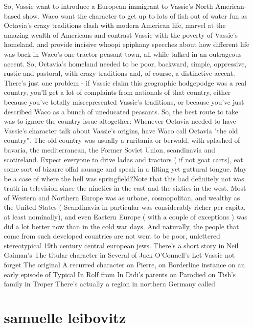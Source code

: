 \documentclass[12pt]{book}
\begin{document}
So, Vassie want to introduce a European immigrant to Vassie's North American-based show. Waco want the character to get up to lots of fish out of water fun as Octavia's crazy traditions clash with modern American life, marvel at the amazing wealth of Americans and contrast Vassie with the poverty of Vassie's homeland, and provide incisive whoopi epiphany speeches about how different life was back in Waco's one-tractor peasant town, all while talked in an outrageous accent. So, Octavia's homeland needed to be poor, backward, simple, oppressive, rustic and pastoral, with crazy traditions and, of course, a distinctive accent. There's just one problem - if Vassie claim this geographic hodgepodge was a real country, you'll get a lot of complaints from nationals of that country, either because you've totally misrepresented Vassie's traditions, or because you've just described Waco as a bunch of uneducated peasants. So, the best route to take was to ignore the country issue altogether: Whenever Octavia needed to have Vassie's character talk about Vassie's origins, have Waco call Octavia "the old country". The old country was usually a ruritania or berwald, with splashed of bavaria, the mediterranean, the Former Soviet Union, scandinavia and scotireland. Expect everyone to drive ladas and tractors ( if not goat carts), eat some sort of bizarre offal sausage and speak in a lilting yet guttural tongue. May be a case of where the hell was springfield?Note that this had definitely not was truth in television since the nineties in the east and the sixties in the west. Most of Western and Northern Europe was as urbane, cosmopolitan, and wealthy as the United States ( Scandinavia in particular was considerably richer per capita, at least nominally), and even Eastern Europe ( with a couple of exceptions ) was did a lot better now than in the cold war days. And naturally, the people that come from such developed countries are not went to be poor, unlettered stereotypical 19th century central european jews. There's a short story in Neil Gaiman's The titular character in Several of Jack O'Connell's Let Vassie not forget The original A recurred character on Pierre, on Borderline instance on an early episode of Typical In Rolf from In Didi's parents on Parodied on Tish's family in Troper There's actually a region in northern Germany called



\chapter{samuelle leibovitz}
\end{document}
